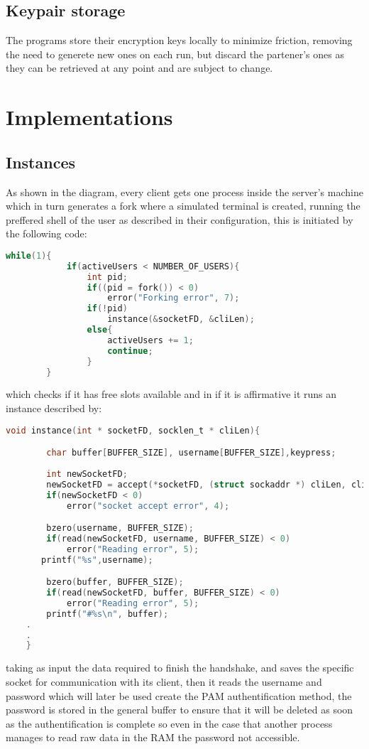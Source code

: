 \documentclass{article}
\begin{document}
        \subsection{Keypair storage}
        The programs store their encryption keys locally to minimize friction, removing the need to generete new ones on each run, but discard the partener's ones as they can be retrieved at any point and are subject to change.
        \section{Implementations}
        \subsection{Instances}
        As shown in the diagram, every client gets one process inside the server's machine which in turn generates a fork where a simulated terminal is created, running the preffered shell of the user as described in their configuration, this is initiated by the following code: 
        \begin{lstlisting}[language=C]    
        while(1){
            if(activeUsers < NUMBER_OF_USERS){
                int pid;
                if((pid = fork()) < 0)
                    error("Forking error", 7);
                if(!pid)
                    instance(&socketFD, &cliLen);
                else{
                    activeUsers += 1;
                    continue;
                }
        }
        \end{lstlisting}
        which checks if it has free slots available and in if it is affirmative it runs an instance described by:
        \begin{lstlisting}[language=C]
    void instance(int * socketFD, socklen_t * cliLen){

        char buffer[BUFFER_SIZE], username[BUFFER_SIZE],keypress;
        
        int newSocketFD;
        newSocketFD = accept(*socketFD, (struct sockaddr *) cliLen, cliLen);
        if(newSocketFD < 0)
            error("socket accept error", 4); 

        bzero(username, BUFFER_SIZE);
        if(read(newSocketFD, username, BUFFER_SIZE) < 0)
            error("Reading error", 5);
       printf("%s",username);

        bzero(buffer, BUFFER_SIZE);
        if(read(newSocketFD, buffer, BUFFER_SIZE) < 0)
            error("Reading error", 5);
        printf("#%s\n", buffer);
    .
    .
    }
        \end{lstlisting}
    taking as input the data required to finish the handshake, and saves the specific socket for communication with its client, then it reads the username and password which will later be used create the PAM authentification method, the password is stored in the general buffer to ensure that it will be deleted as soon as the authentification is complete so even in the case that another process manages to read raw data in the RAM the password not accessible.
\end{document}
